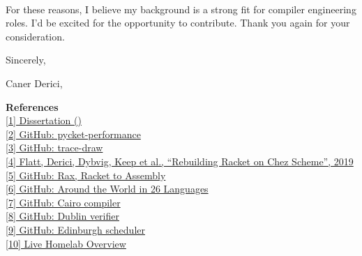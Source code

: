\paragraph{} %
For these reasons, I believe my background is a strong fit for compiler engineering roles. I'd be excited for the opportunity to contribute. Thank you again for your consideration.

\vspace{1.2em}

Sincerely,

Caner Derici, 

\vfill

{\small
	\noindent\textbf{References} \\[0.25em]
	\noindent \href{\dissertationurl}{[1]  Dissertation ()} \\
	\noindent \href{\pycketperfurl}{[2] GitHub: pycket-performance} \\
	\noindent \href{\tracedrawurl}{[3] GitHub: trace-draw} \\
	\noindent \href{\icfpreporturl}{[4] Flatt, Derici, Dybvig, Keep et al., ``Rebuilding Racket on Chez Scheme'',  2019} \\
	\noindent \href{\raxurl}{[5] GitHub: Rax, Racket to  Assembly} \\
	\noindent \href{\atwurl}{[6] GitHub: Around the World in 26 Languages} \\
	\noindent \href{\cairolang}{[7] GitHub: Cairo compiler} \\
	\noindent \href{\dublinlang}{[8] GitHub: Dublin verifier} \\
	\noindent \href{\edinlang}{[9] GitHub: Edinburgh scheduler} \\
	\noindent \href{\homelaburl}{[10] Live Homelab Overview}
}



